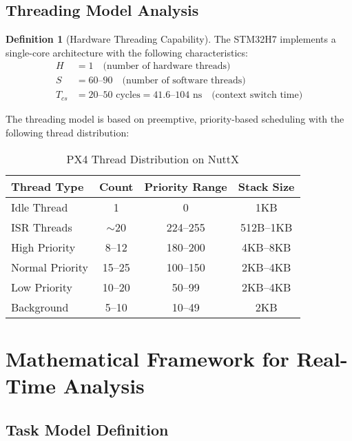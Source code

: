 \documentclass[11pt,a4paper]{article}
\theoremstyle{definition}
\newtheorem{definition}[theorem]{Definition}
\theoremstyle{remark}
\begin{document}
\subsection{Threading Model Analysis}

\begin{definition}[Hardware Threading Capability]
The STM32H7 implements a single-core architecture with the following characteristics:
\begin{align}
H &= 1 \quad \text{(number of hardware threads)} \\
S &= 60\text{--}90 \quad \text{(number of software threads)} \\
T_{cs} &= 20\text{--}50 \text{ cycles} = 41.6\text{--}104 \text{ ns} \quad \text{(context switch time)}
\end{align}
\end{definition}

The threading model is based on preemptive, priority-based scheduling with the following thread distribution:

\begin{table}[h]
\centering
\caption{PX4 Thread Distribution on NuttX}
\label{tab:thread_distribution}
\begin{tabular}{lccc}
\toprule
\textbf{Thread Type} & \textbf{Count} & \textbf{Priority Range} & \textbf{Stack Size} \\
\midrule
Idle Thread & 1 & 0 & 1KB \\
ISR Threads & $\sim$20 & 224--255 & 512B--1KB \\
High Priority & 8--12 & 180--200 & 4KB--8KB \\
Normal Priority & 15--25 & 100--150 & 2KB--4KB \\
Low Priority & 10--20 & 50--99 & 2KB--4KB \\
Background & 5--10 & 10--49 & 2KB \\
\bottomrule
\end{tabular}
\end{table}

\section{Mathematical Framework for Real-Time Analysis}

\subsection{Task Model Definition}
\end{document}
